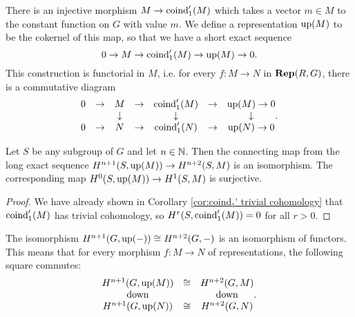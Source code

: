 \begin{definition} \label{def:up}
	There is an injective morphism $M \to \mathrm{coind}_1'(M)$ which takes a vector $m \in M$
	to the constant function on $G$ with value $m$.
	We define a representation $\mathrm{up}(M)$ to be the cokernel of this map, so that we have a short exact
	sequence
	\[
		0 \to M \to \mathrm{coind}_1'(M) \to \mathrm{up}(M) \to 0.
	\]
	This construction is functorial in $M$, i.e. for every $f : M \to N$ in $\mathbf{Rep}(R,G)$,
	there is a commutative diagram
	\[
		\begin{matrix}
			0 & \to& M & \to & \mathrm{coind}_1'(M) & \to& \mathrm{up}(M) \to 0 \\
			&&\downarrow &&\downarrow&&\downarrow \\
			0 & \to& N & \to & \mathrm{coind}_1'(N) & \to& \mathrm{up}(N) \to 0 \\
		\end{matrix}.
	\]
\end{definition}

\begin{corollary}	\label{cor:up iso}
	\leanok
	Let $S$ be any subgroup of $G$ and let $n \in {\mathbb N}$.
	Then the connecting map from the long exact sequence $H^{n+1}(S,\mathrm{up}(M)) \to H^{n+2}(S,M)$ is an
	isomorphism.
	The corresponding map $H^{0}(S,\mathrm{up}(M)) \to H^{1}(S,M)$ is	surjective.
\end{corollary}

\begin{proof}
	We have already shown in Corollary \ref{cor:coind₁' trivial cohomology}
	that $\mathrm{coind}_1'(M)$ has trivial cohomology, so $H^{r}(S,\mathrm{coind}_1'(M))=0$
	for all $r>0$.
\end{proof}

\begin{lemma}	\label{lem:up iso natural}
	\leanok
	The isomorphism $H^{n+1}(G,\mathrm{up}(-)) \cong H^{n+2}(G,-)$ is an isomorphism of functors.
	This means that for every morphism $f : M \to N$ of representations, the following square commutes:
	\[
		\begin{matrix}
			H^{n+1}(G,\mathrm{up}(M)) & \cong & H^{n+2}(G,M) \\
			\mathrm{down} && \mathrm{down} \\
			H^{n+1}(G,\mathrm{up}(N)) & \cong & H^{n+2}(G,N)
		\end{matrix}.
	\]
\end{lemma}

